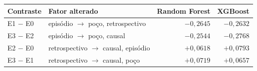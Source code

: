 \begin{tabular}{llrr}
\toprule
Contraste & Fator alterado & Random Forest & XGBoost \\
\midrule
E1 $-$ E0 & episódio $\rightarrow$ poço, retrospectivo & $-0,2645$ & $-0,2632$ \\
E3 $-$ E2 & episódio $\rightarrow$ poço, causal & $-0,2544$ & $-0,2768$ \\
E2 $-$ E0 & retrospectivo $\rightarrow$ causal, episódio & $+0,0618$ & $+0,0793$ \\
E3 $-$ E1 & retrospectivo $\rightarrow$ causal, poço & $+0,0719$ & $+0,0657$ \\
\bottomrule
\end{tabular}
